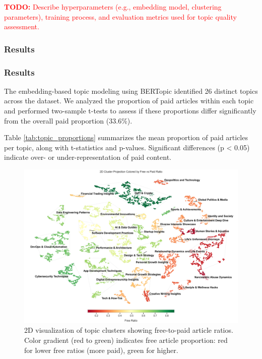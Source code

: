 \documentclass[11pt,a4paper]{article}
\newcommand{\todo}[1]{\textcolor{red}{\textbf{TODO:} #1}}
\begin{document}
\todo{Describe hyperparameters (e.g., embedding model, clustering parameters), training process, and evaluation metrics used for topic quality assessment.}

\subsubsection{Results}

\subsubsection{Results}

The embedding-based topic modeling using BERTopic identified 26 distinct topics across the dataset. We analyzed the proportion of paid articles within each topic and performed two-sample t-tests to assess if these proportions differ significantly from the overall paid proportion (33.6\%).

Table \ref{tab:topic_proportions} summarizes the mean proportion of paid articles per topic, along with t-statistics and p-values. Significant differences (p < 0.05) indicate over- or under-representation of paid content.

\begin{figure}[H]
    \centering
    \includegraphics[width=\textwidth]{images/2D_Cluster_Free_Paid_Ratio.png}
    \caption{2D visualization of topic clusters showing free-to-paid article ratios. Color gradient (red to green) indicates free article proportion: red for lower free ratios (more paid), green for higher.}
    \label{fig:2d_clusters}
\end{figure}
\end{document}
